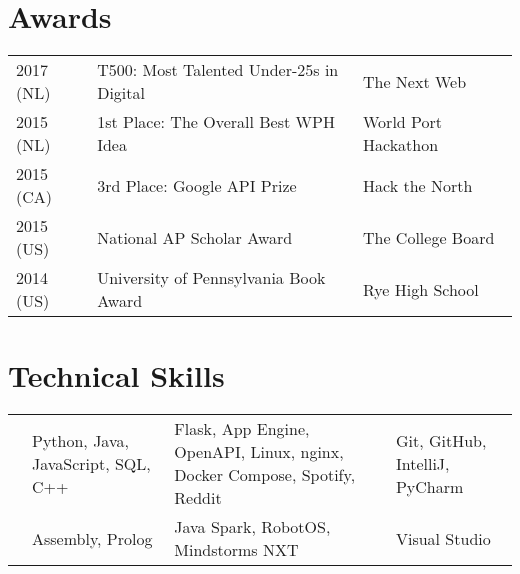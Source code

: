 \documentclass[]{deedy-resume-openfont}
\begin{document}
\begin{minipage}[t]{0.66\textwidth}
\section{Awards} 
\begin{tabular}{lll}
2017 (NL)   & T500: Most Talented Under-25s in Digital  & The Next Web\\
2015 (NL)   & 1st Place: The Overall Best WPH Idea      & World Port Hackathon\\
2015 (CA)   & 3rd Place: Google API Prize               & Hack the North\\
2015 (US)   & National AP Scholar Award                 & The College Board\\
2014 (US)   & University of Pennsylvania Book Award     & Rye High School\\
\end{tabular}
\sectionsep


\section{Technical Skills}
\vspace{-\topsep}
\begin{tabulary}{\linewidth}{LLLL}
    &  &  &  \\
    \hline
     & Python, Java, JavaScript, SQL, C++ & Flask, App Engine, OpenAPI, Linux, nginx, Docker Compose, Spotify, Reddit  & Git, GitHub, IntelliJ, PyCharm \\
    \hline
     & Assembly, Prolog & Java Spark, RobotOS, Mindstorms NXT & Visual Studio \\
\end{tabulary} 

\end{minipage} 
\end{document}
